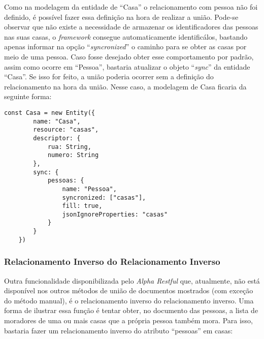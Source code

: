 Como na modelagem da entidade de ``Casa'' o relacionamento com pessoa não foi definido, é possível fazer essa definição na hora de realizar a união. Pode-se observar que não existe a necessidade de armazenar os identificadores das pessoas nas suas casas, o \textit{framework} consegue automaticamente identificálos, bastando apenas informar na opção ``\textit{syncronized}'' o caminho para se obter as casas por meio de uma pessoa. Caso fosse desejado obter esse comportamento por padrão, assim como ocorre em ``Pessoa'', bastaria atualizar o objeto ``\textit{sync}'' da entidade ``Casa''. Se isso for feito, a união poderia ocorrer sem a definição do relacionamento na hora da união. Nesse caso, a modelagem de Casa ficaria da seguinte forma:

\begin{lstlisting}[style=ES6, caption={Definição do \textit{Schema} de Casa}]
    const Casa = new Entity({
        name: "Casa",
        resource: "casas",
        descriptor: {
            rua: String,
            numero: String
        },
        sync: {
            pessoas: {
                name: "Pessoa",
                syncronized: ["casas"],
                fill: true,
                jsonIgnoreProperties: "casas"
            }
        }
    })
\end{lstlisting}

\subsubsection{Relacionamento Inverso do Relacionamento Inverso}

Outra funcionalidade disponibilizada pelo \textit{Alpha Restful} que, atualmente, não está disponível nos outros métodos de união de documentos mostrados (com exceção do método manual), é o relacionamento inverso do relacionamento inverso. Uma forma de ilustrar essa função é tentar obter, no documento das pessoas, a lista de moradores de uma ou mais casas que a própria pessoa também mora. Para isso, bastaria fazer um relacionamento inverso do atributo ``pessoas'' em casas:

